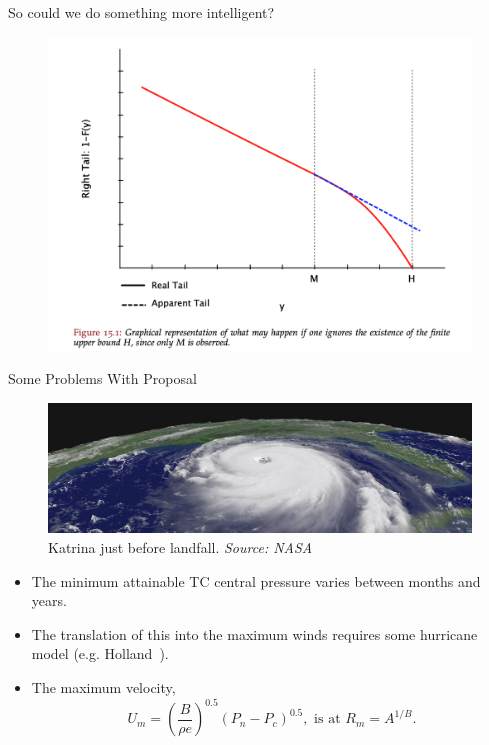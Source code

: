\begin{frame}{So could we do something more intelligent?~\cite{taleb2019statistical}}
\vspace{-20pt}
 \begin{minipage}{1.0\textwidth}
\begin{figure}[htb!]
    \centering
    \includegraphics[width=1\linewidth]{images/nnt-upper-bound.png}
    \vspace{-15pt}

\end{figure}
\end{minipage}
\end{frame}

\begin{frame}{Some Problems With Proposal}
\vspace{-15pt}
\begin{figure}
\includegraphics[width=\linewidth]{images/NASA-KATRINA-SIDEON.jpg}\\
Katrina just before landfall. \textit{Source: NASA}
\end{figure}
\vspace{-10pt}
\begin{itemize}
\item The minimum attainable TC central pressure varies between months and years.
\item The translation of this into the maximum winds requires some hurricane model
    (e.g. Holland~\cite{holland1980analytic, holland2010revised}).
\item
    The maximum velocity,
    \begin{equation}
    U_m = (\frac{B}{\rho e})^{0.5}(P_n-P_c)^{0.5}, \text{ is at }
    R_m = A^{1/B}.
    \end{equation}
\end{itemize}
\end{frame}


